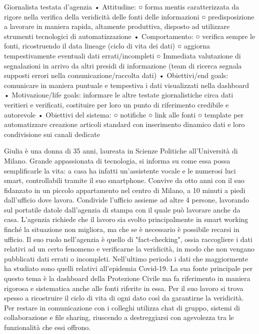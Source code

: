 Giornalista testata d'agenzia
• Attitudine:
○ forma mentis caratterizzata da rigore nella verifica della veridicità delle fonti delle informazioni
○ predisposizione a lavorare in maniera rapida, altamente produttiva, disposto ad utilizzare strumenti tecnologici di automatizzazione
• Comportamento: 
○ verifica sempre le fonti, ricostruendo il data lineage (ciclo di vita dei dati)
○ aggiorna tempestivamente eventuali dati errati/incompleti
○ Immediata valutazione di segnalazioni in arrivo da altri presidi di informazione (team di ricerca segnala supposti errori nella comunicazione/raccolta dati)
• Obiettivi/end goals: comunicare in maniera puntuale e tempestiva i dati visualizzati nella dashboard
• Motivazione/life goals: informare le altre testate giornalistiche circa dati veritieri e verificati, costituire per loro un punto di riferimento credibile e autorevole
• Obiettivi del sistema:
○ notifiche
○ link alle fonti
○ template per automatizzare creazione articoli standard con inserimento dinamico dati e loro condivisione sui canali dedicate

Giulia è una donna di 35 anni, laureata in Scienze Politiche all'Università di Milano.
Grande appassionata di tecnologia, si informa su come essa possa semplificarle la vita: a casa ha infatti un'assistente vocale e le numerosi luci smart, controllabili tramite il suo smartphone.
Convive da otto anni con il suo fidanzato in un piccolo appartamento nel centro di Milano, a 10 minuti a piedi dall'ufficio dove lavora. Condivide l'ufficio assieme ad altre 4 persone, lavorando sul portatile datole dall'agenzia di stampa con il quale può lavorare anche da casa. L'agenzia richiede che il lavoro sia svolto principalmente in smart working finché la situazione non migliora, ma che se è necessario è possibile recarsi in ufficio.
Il suo ruolo nell'agenzia è quello di "fact-checking", ossia raccogliere i dati relativi ad un certo fenomeno e verificarne la veridicità, in modo che non vengano pubblicati dati errati o incompleti. 
Nell'ultimo periodo i dati che maggiormente ha studiato sono quelli relativi all'epidemia Covid-19. La sua fonte principale per questo tema è la dashboard della Protezione Civile ma fa riferimento in maniera rigorosa e sistematica anche alle fonti riferite in essa. Per il suo lavoro si trova spesso a ricostruire il ciclo di vita di ogni dato così da garantirne la veridicità. 
Per restare in comunicazione con i colleghi utilizza chat di gruppo, sistemi di collaborazione e file sharing, riuscendo a destreggiarsi con agevolezza tra le funzionalità che essi offrono. 

